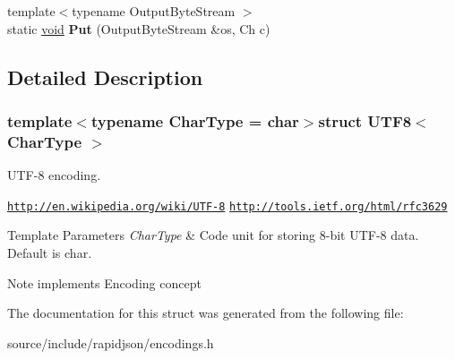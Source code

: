 \begin{DoxyCompactItemize}
\item 
\hypertarget{struct_u_t_f8_ab24c23227413798e9be28a21eb26fe51}{}{\footnotesize template$<$typename Output\+Byte\+Stream $>$ }\\static \hyperlink{_s_d_l__audio_8h_a52835ae37c4bb905b903cbaf5d04b05f}{void} {\bfseries Put} (Output\+Byte\+Stream \&os, Ch c)\label{struct_u_t_f8_ab24c23227413798e9be28a21eb26fe51}

\end{DoxyCompactItemize}


\subsection{Detailed Description}
\subsubsection*{template$<$typename Char\+Type = char$>$struct U\+T\+F8$<$ Char\+Type $>$}

U\+T\+F-\/8 encoding. 

\href{http://en.wikipedia.org/wiki/UTF-8}{\tt http\+://en.\+wikipedia.\+org/wiki/\+U\+T\+F-\/8} \href{http://tools.ietf.org/html/rfc3629}{\tt http\+://tools.\+ietf.\+org/html/rfc3629} 
\begin{DoxyTemplParams}{Template Parameters}
{\em Char\+Type} & Code unit for storing 8-\/bit U\+T\+F-\/8 data. Default is char. \\
\hline
\end{DoxyTemplParams}
\begin{DoxyNote}{Note}
implements Encoding concept 
\end{DoxyNote}


The documentation for this struct was generated from the following file\+:\begin{DoxyCompactItemize}
\item 
source/include/rapidjson/encodings.\+h\end{DoxyCompactItemize}
